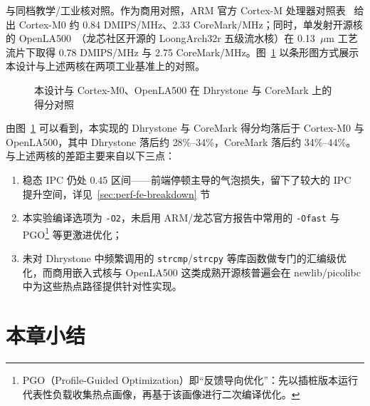 与同档教学/工业核对照。作为商用对照，ARM 官方 Cortex-M 处理器对照表~\cite{arm2024cortexm3} 给出 Cortex-M0 约 0.84 DMIPS/MHz、2.33 CoreMark/MHz；同时，单发射开源核的 OpenLA500~\cite{openla500}（龙芯社区开源的 LoongArch32r 五级流水核）在 0.13~$\mu$m 工艺流片下取得 0.78 DMIPS/MHz 与 2.75 CoreMark/MHz。图~\ref{fig:perf-cmp} 以条形图方式展示本设计与上述两核在两项工业基准上的对照。

\begin{figure}[H]
  \centering
  \caption{本设计与 Cortex-M0、OpenLA500 在 Dhrystone 与 CoreMark 上的得分对照}
  \label{fig:perf-cmp}
\end{figure}

由图~\ref{fig:perf-cmp} 可以看到，本实现的 Dhrystone 与 CoreMark 得分均落后于 Cortex-M0 与 OpenLA500，其中 Dhrystone 落后约 28\%--34\%，CoreMark 落后约 34\%--44\%。与上述两核的差距主要来自以下三点：

\begin{enumerate}
  \item 稳态 IPC 仍处 0.45 区间——前端停顿主导的气泡损失，留下了较大的 IPC 提升空间，详见~\ref{sec:perf-fe-breakdown} 节
  \item 本实验编译选项为 \lstinline|-O2|，未启用 ARM/龙芯官方报告中常用的 \lstinline|-Ofast| 与 PGO\footnote{PGO（Profile-Guided Optimization）即“反馈导向优化”：先以插桩版本运行代表性负载收集热点画像，再基于该画像进行二次编译优化。} 等更激进优化；
  \item 未对 Dhrystone 中频繁调用的 \lstinline|strcmp|/\lstinline|strcpy| 等库函数做专门的汇编级优化，而商用嵌入式核与 OpenLA500 这类成熟开源核普遍会在 newlib/picolibc 中为这些热点路径提供针对性实现。
\end{enumerate}

\section{本章小结}

